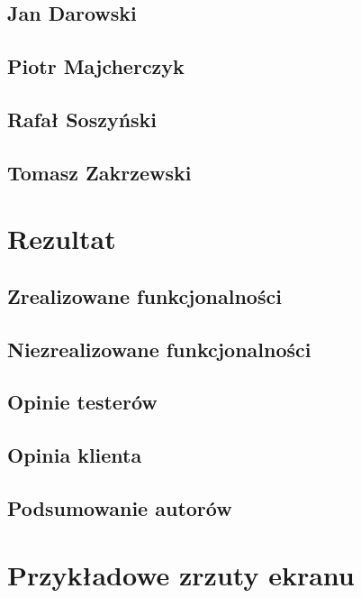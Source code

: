 \documentclass[licencjacka]{pracamgr}
\begin{document}
  \section{Jan Darowski}

  \section{Piotr Majcherczyk}

  \section{Rafał Soszyński}

  \section{Tomasz Zakrzewski}

\chapter{Rezultat}

  \section{Zrealizowane funkcjonalności}

  \section{Niezrealizowane funkcjonalności}

  \section{Opinie testerów}

  \section{Opinia klienta}
  
  \section{Podsumowanie autorów}

\appendix

  \chapter{Przykładowe zrzuty ekranu}
\end{document}
